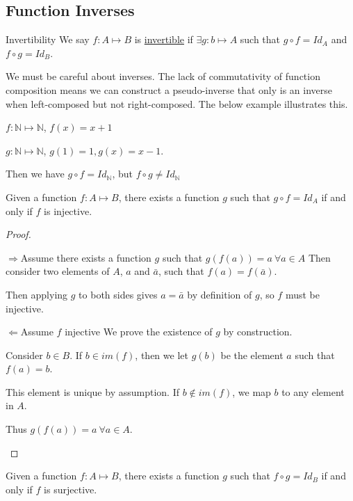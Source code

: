 \documentclass[../Main.tex]{subfiles}
\begin{document}
\subsection{Function Inverses}
\begin{definition}{Invertibility}
    We say $f : A \mapsto B$ is \underline{invertible} if $\exists g : b \mapsto A$ such that $g \circ f = Id_A$ and $f \circ g = Id_B$.
\end{definition}
We must be careful about inverses. The lack of commutativity of function composition means we can construct a pseudo-inverse that only is an inverse when left-composed but not right-composed. The below example illustrates this.
\begin{example}
    $f : \mathbb{N} \mapsto \mathbb{N}$, $f(x) = x + 1$\par
    $g : \mathbb{N} \mapsto \mathbb{N}$, $g(1) = 1, g(x) = x - 1$.\par
    Then we have $g \circ f = Id_\mathbb{N}$, but $f \circ g \neq Id_\mathbb{N}$
\end{example}
\begin{proposition}
    Given a function $f : A \mapsto B$, there exists a function $g$ such that $g \circ f = Id_A$ if and only if $f$ is injective.
    \label{propInjectiveIffLeftInverse}
\end{proposition}
\begin{proof}
    \begin{proofdirection}{$\Rightarrow$}{Assume there exists a function $g$ such that $g(f(a)) = a~\forall a \in A$}
        Then consider two elements of $A$, $a$ and $\bar{a}$, such that $f(a) = f(\bar{a})$.\par
        Then applying $g$ to both sides gives $a = \bar{a}$ by definition of $g$, so $f$ must be injective.
    \end{proofdirection}
    \begin{proofdirection}{$\Leftarrow$}{Assume $f$ injective}
        We prove the existence of $g$ by construction.\par
        Consider $b \in B$. If $b \in im(f)$, then we let $g(b)$ be the element $a$ such that $f(a) = b$.\par
        This element is unique by assumption. If $b \notin im(f)$, we map $b$ to any element in $A$.\par
        Thus $g(f(a)) = a~\forall a \in A$.
    \end{proofdirection}
\end{proof}
\begin{proposition}
    Given a function $f : A \mapsto B$, there exists a function $g$ such that $f \circ g = Id_B$ if and only if $f$ is surjective.
    \label{propSurjectiveIffRightInverse}
\end{proposition}
\end{document}
